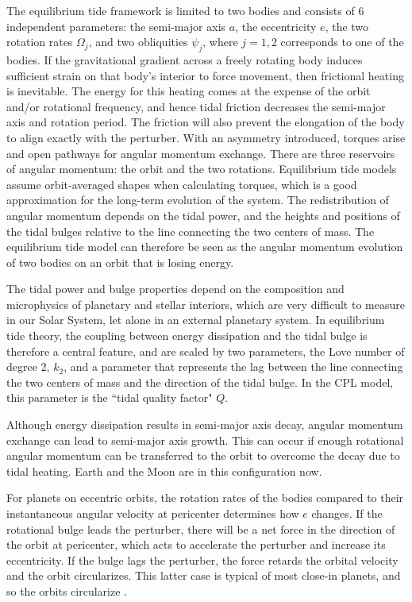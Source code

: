 \documentclass[preprint,12pt]{aastex}
\begin{document}
The equilibrium tide framework is limited to two bodies and consists
of 6 independent parameters: the semi-major axis $a$, the eccentricity
$e$, the two rotation rates $\Omega_j$, and two obliquities $\psi_j$,
where $j=1,2$ corresponds to one of the bodies. If the gravitational
gradient across a freely rotating body induces sufficient strain on
that body's interior to force movement, then frictional heating is
inevitable. The energy for this heating comes at the expense of the
orbit and/or rotational frequency, and hence tidal friction decreases
the semi-major axis and rotation period. The friction will also
prevent the elongation of the body to align exactly with the
perturber. With an asymmetry introduced, torques arise and open
pathways for angular momentum exchange. There are three reservoirs of
angular momentum: the orbit and the two rotations. Equilibrium tide
models assume orbit-averaged shapes when calculating torques, which is
a good approximation for the long-term evolution of the system. The
redistribution of angular momentum depends on the tidal power, and the
heights and positions of the tidal bulges relative to the line
connecting the two centers of mass. The equilibrium tide model can
therefore be seen as the angular momentum evolution of two bodies on
an orbit that is losing energy.

The tidal power and bulge properties depend on the composition and
microphysics of planetary and stellar interiors, which are very
difficult to measure in our Solar System, let alone in an external
planetary system. In equilibrium tide theory, the coupling between energy
dissipation and the tidal bulge is therefore a central feature, and
are scaled by two parameters, the Love number of degree 2, $k_2$, and
a parameter that represents the lag between the line connecting the
two centers of mass and the direction of the tidal bulge. In the CPL
model, this parameter is the ``tidal quality factor" $Q$.

Although energy dissipation results in semi-major axis decay, angular
momentum exchange can lead to semi-major axis growth. This can occur
if enough rotational angular momentum can be transferred to the orbit
to overcome the decay due to tidal heating. Earth and the Moon are in
this configuration now.

For planets on eccentric orbits, the rotation rates of the bodies
compared to their instantaneous angular velocity at pericenter
determines how $e$ changes. If the rotational bulge leads the
perturber, there will be a net force in the direction of the orbit at
pericenter, which acts to accelerate the perturber and increase its
eccentricity. If the bulge lags the perturber, the force retards the
orbital velocity and the orbit circularizes. This latter case is
typical of most close-in planets, and so the orbits circularize
\citep{Rasio96,Jackson08a}.
\end{document}
